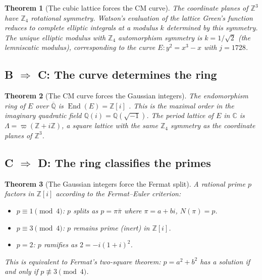 \documentclass[12pt]{article}
\newtheorem{theorem}{Theorem}[section]
\theoremstyle{definition}
\theoremstyle{remark}
\begin{document}
\begin{theorem}[The cubic lattice forces the CM curve]
\label{thm:AtoB}
The coordinate planes of $\mathbb{Z}^3$ have $\mathbb{Z}_4$ rotational symmetry. Watson's evaluation of the lattice Green's function \cite{watson1939} reduces to complete elliptic integrals at a modulus $k$ determined by this symmetry. The unique elliptic modulus with $\mathbb{Z}_4$ automorphism symmetry is $k = 1/\sqrt{2}$ (the lemniscatic modulus), corresponding to the curve $E\!: y^2 = x^3 - x$ with $j = 1728$.
\end{theorem}

\subsection{B $\Rightarrow$ C: The curve determines the ring}

\begin{theorem}[The CM curve forces the Gaussian integers]
\label{thm:BtoC}
The endomorphism ring of $E$ over $\overline{\mathbb{Q}}$ is $\operatorname{End}(E) = \mathbb{Z}[i]$ \cite{silverman}. This is the maximal order in the imaginary quadratic field $\mathbb{Q}(i) = \mathbb{Q}(\sqrt{-1})$. The period lattice of $E$ in $\mathbb{C}$ is $\Lambda = \varpi(\mathbb{Z} + i\mathbb{Z})$, a square lattice with the same $\mathbb{Z}_4$ symmetry as the coordinate planes of $\mathbb{Z}^3$.
\end{theorem}

\subsection{C $\Rightarrow$ D: The ring classifies the primes}

\begin{theorem}[The Gaussian integers force the Fermat split]
\label{thm:CtoD}
A rational prime $p$ factors in $\mathbb{Z}[i]$ according to the Fermat--Euler criterion:
\begin{itemize}[nosep]
    \item $p \equiv 1 \pmod{4}$: $p$ \emph{splits} as $p = \pi \bar{\pi}$ where $\pi = a + bi$, $N(\pi) = p$.
    \item $p \equiv 3 \pmod{4}$: $p$ \emph{remains prime} (inert) in $\mathbb{Z}[i]$.
    \item $p = 2$: $p$ \emph{ramifies} as $2 = -i(1+i)^2$.
\end{itemize}
This is equivalent to Fermat's two-square theorem: $p = a^2 + b^2$ has a solution if and only if $p \not\equiv 3 \pmod{4}$.
\end{theorem}
\end{document}
